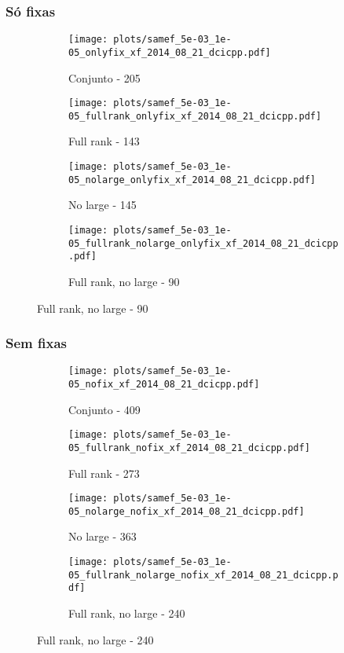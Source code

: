 \documentclass{article}
\begin{document}
\subsubsection{Só fixas}
\begin{figure}[H]
  \centering
  \begin{subfigure}{0.48\textwidth}
    \texttt{[image: plots/samef\_5e-03\_1e-05\_onlyfix\_xf\_2014\_08\_21\_dcicpp.pdf]}
    \caption{Conjunto - 205}
  \end{subfigure}
  \begin{subfigure}{0.48\textwidth}
    \texttt{[image: plots/samef\_5e-03\_1e-05\_fullrank\_onlyfix\_xf\_2014\_08\_21\_dcicpp.pdf]}
    \caption{Full rank - 143}
  \end{subfigure}
  \begin{subfigure}{0.48\textwidth}
    \texttt{[image: plots/samef\_5e-03\_1e-05\_nolarge\_onlyfix\_xf\_2014\_08\_21\_dcicpp.pdf]}
    \caption{No large - 145}
  \end{subfigure}
  \begin{subfigure}{0.48\textwidth}
    \texttt{[image: plots/samef\_5e-03\_1e-05\_fullrank\_nolarge\_onlyfix\_xf\_2014\_08\_21\_dcicpp.pdf]}
    \caption{Full rank, no large - 90}
  \end{subfigure}
\end{figure}

\subsubsection{Sem fixas}
\begin{figure}[H]
  \centering
  \begin{subfigure}{0.48\textwidth}
    \texttt{[image: plots/samef\_5e-03\_1e-05\_nofix\_xf\_2014\_08\_21\_dcicpp.pdf]}
    \caption{Conjunto - 409}
  \end{subfigure}
  \begin{subfigure}{0.48\textwidth}
    \texttt{[image: plots/samef\_5e-03\_1e-05\_fullrank\_nofix\_xf\_2014\_08\_21\_dcicpp.pdf]}
    \caption{Full rank - 273}
  \end{subfigure}
  \begin{subfigure}{0.48\textwidth}
    \texttt{[image: plots/samef\_5e-03\_1e-05\_nolarge\_nofix\_xf\_2014\_08\_21\_dcicpp.pdf]}
    \caption{No large - 363}
  \end{subfigure}
  \begin{subfigure}{0.48\textwidth}
    \texttt{[image: plots/samef\_5e-03\_1e-05\_fullrank\_nolarge\_nofix\_xf\_2014\_08\_21\_dcicpp.pdf]}
    \caption{Full rank, no large - 240}
  \end{subfigure}
\end{figure}



\end{document}
